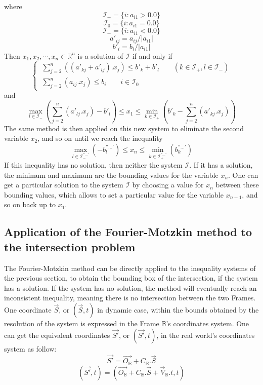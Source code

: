 \documentclass[12pt, a4paper]{article}
\begin{document}
where 
$$\mathcal{I}_+=\{i:a_{i1}>0.0\}$$
$$\mathcal{I}_0=\{i:a_{i1}=0.0\}$$
$$\mathcal{I}_-=\{i:a_{i1}<0.0\}$$
$$a'_{ij}=a_{ij}/|a_{i1}|$$
$$b'_i=b_i/|a_{i1}|$$
Then $x_1, x_2, \cdots, x_n\in\mathbb{R}^n$ is a solution of $\mathcal{I}$ if and only if
\begin{equation}
\left\{\
\begin{array}{c}
\sum_{j=2}^n((a'_{kj}+a'_{lj}).x_j)\le b'_k+b'_l \qquad (k\in\mathcal{I}_+, l\in\mathcal{I}_-)\\
\sum_{j=2}^n(a_{ij}.x_j)\le b_i \qquad i\in\mathcal{I}_0
\end{array}
\right.
\end{equation}
and
\begin{equation}
\max_{l\in\mathcal{I}_-}(\sum_{j=2}^n(a'_{lj}.x_j)-b'_l)\le x_1\le\min_{k\in\mathcal{I}_+}(b'_k-\sum_{j=2}^n(a'_{kj}.x_j))
\end{equation}
The same method is then applied on this new system to eliminate the second variable $x_2$, and so on until we reach the inequality
\begin{equation}
\max_{l\in\mathcal{I}^{''...'}_-}(-b^{''...'}_l)\le x_n\le\min_{k\in\mathcal{I}^{''...'}_+}(b^{''...'}_k)
\end{equation}
If this inequality has no solution, then neither the system $\mathcal{I}$. If it has a solution, the minimum and maximum are the bounding values for the variable $x_n$. One can get a particular solution to the system $\mathcal{I}$ by choosing a value for $x_n$ between these bounding values, which allows to set a particular value for the variable $x_{n-1}$, and so on back up to $x_1$. 

\subsection{Application of the Fourier-Motzkin method to the intersection problem}

The Fourier-Motzkin method can be directly applied to the inequality systems of the previous section, to obtain the bounding box of the intersection, if the system has a solution. If the system has no solution, the method will eventually reach an inconsistent inequality, meaning there is no intersection between the two Frames.\\

One coordinate $\overrightarrow{S}$, or $(\overrightarrow{S}, t)$ in dynamic case, within the bounds obtained by the resolution of the system is expressed in the Frame $\mathbb{B}$'s coordinates system. One can get the equivalent coordinates $\overrightarrow{S'}$, or $(\overrightarrow{S'}, t)$, in the real world's coordinates system as follow:
\begin{equation}
\overrightarrow{S'}=\overrightarrow{O_\mathbb{B}}+C_\mathbb{B}.\overrightarrow{S}
\end{equation}
\begin{equation}
(\overrightarrow{S'},t)=\left(\overrightarrow{O_\mathbb{B}}+C_\mathbb{B}.\overrightarrow{S}+\overrightarrow{V}_\mathbb{B}.t, t\right)
\end{equation}
\end{document}
